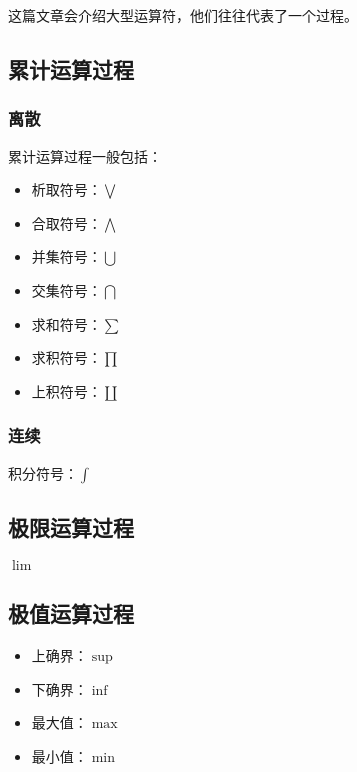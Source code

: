
\begin{issues}
\issueDraft
\end{issues}

这篇文章会介绍大型运算符，他们往往代表了一个过程。

\subsection{累计运算过程}
\subsubsection{离散}
累计运算过程一般包括：
\begin{itemize}
\item 析取符号：$\bigvee$
\item 合取符号：$\bigwedge$
\item 并集符号：$\bigcup$
\item 交集符号：$\bigcap$
\item 求和符号：$\sum$
\item 求积符号：$\prod$
\item 上积符号：$\coprod$
\end{itemize}
\subsubsection{连续}
积分符号：$\int$
\subsection{极限运算过程}

$\lim$

\subsection{极值运算过程}

\begin{itemize}
\item 上确界：$\sup$
\item 下确界：$\inf$
\item 最大值：$\max$
\item 最小值：$\min$
\end{itemize}
